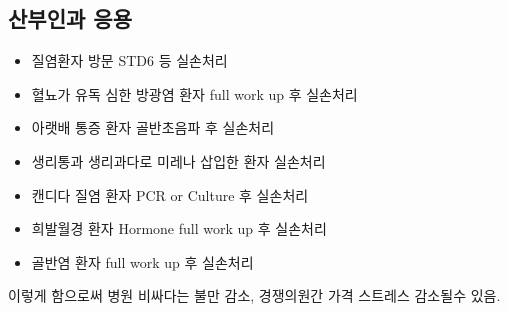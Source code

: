 \subsection{산부인과 응용}
\begin{mdframed}[linecolor=blue,middlelinewidth=2]
\begin{itemize}\tightlist
\item 질염환자 방문 \MVRightarrow STD6 등 실손처리
\item 혈뇨가 유독 심한 방광염 환자 \MVRightarrow full work up 후 실손처리
\item 아랫배 통증 환자 \MVRightarrow 골반초음파 후 실손처리
\item 생리통과 생리과다로 미레나 삽입한 환자 \MVRightarrow 실손처리
\item 캔디다 질염 환자 \MVRightarrow PCR or Culture 후 실손처리
\item 희발월경 환자 \MVRightarrow Hormone full work up 후 실손처리
\item 골반염 환자 \MVRightarrow full work up 후 실손처리
\end{itemize}
\end{mdframed}
이렇게 함으로써 병원 비싸다는 불만 감소, 경쟁의원간 가격 스트레스 감소될수 있음.